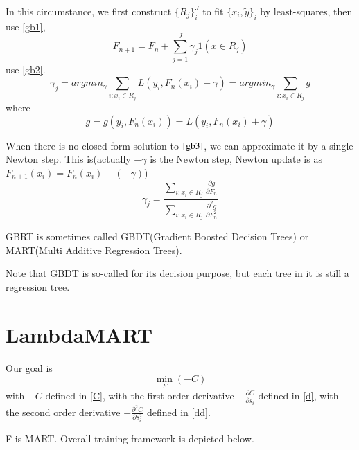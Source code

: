 \documentclass [11pt,a4paper]{article}
\begin{document}
In this circumstance, we first construct $\{R_j\}_i^J$ to fit $\{x_i, \widetilde{y}\}_i$ by least-squares,
then use \ref{gb1},
\begin{equation}
F_{n+1} = F_n + \sum_{j=1}^{J}\gamma_j 1(x \in R_j)
\end{equation}
use \ref{gb2}.
\begin{equation}
\label{gb3}
\gamma_j = argmin_{\gamma} \sum_{i:x_i \in R_j} L\left(y_i, F_n(x_i) + \gamma \right)
= argmin_{\gamma} \sum_{i:x_i \in R_j} g
\end{equation}
where
\begin{equation}
g = g(y_i, F_n(x_i)) = L\left(y_i, F_n(x_i) + \gamma \right)
\end{equation}


When there is no closed form solution to $\ref{gb3}$,
we can approximate it by a single Newton step.
This is(actually $-\gamma$ is the Newton step, Newton update is as $F_{n+1}(x_i) = F_n(x_i) - (-\gamma)$)
\begin{equation}
\gamma_j = \frac
{\sum_{i:x_i \in R_j} \frac{\partial g}{\partial F_n}}
{\sum_{i:x_i \in R_j} \frac{\partial^2 g}{\partial F_n^2}}
\end{equation}


GBRT is sometimes called
GBDT(Gradient Boosted Decision Trees)
or
MART(Multi Additive Regression Trees).


Note that GBDT is so-called for its decision purpose, but each tree in it is still a regression tree.


\section{LambdaMART}
Our goal is
\begin{equation}
\min_{F} (-C)
\end{equation}
with $-C$ defined in \ref{C},
with the first order derivative $-\frac{\partial C}{\partial s_i}$ defined in \ref{d},
with the second order derivative $-\frac{\partial^2 C}{\partial s_i^2}$ defined in \ref{dd}.


F is MART. Overall training framework is depicted below.
\end{document}
